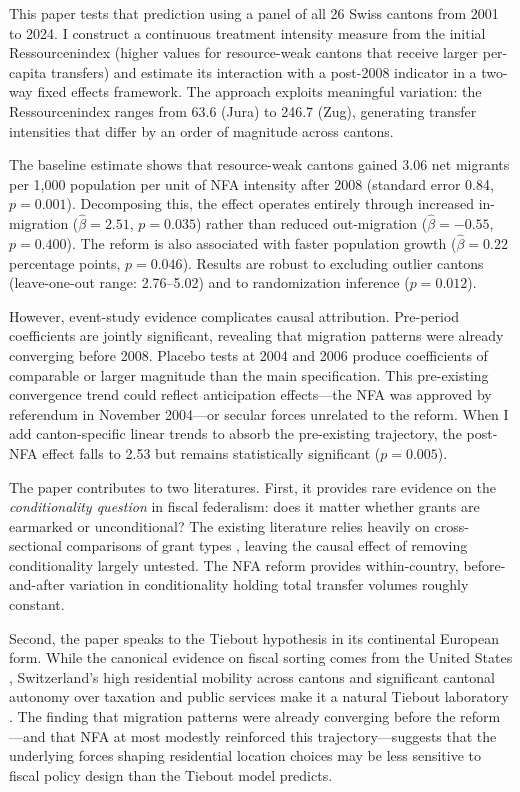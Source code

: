 \documentclass[12pt]{article}
\begin{document}
This paper tests that prediction using a panel of all 26 Swiss cantons from 2001 to 2024. I construct a continuous treatment intensity measure from the initial Ressourcenindex (higher values for resource-weak cantons that receive larger per-capita transfers) and estimate its interaction with a post-2008 indicator in a two-way fixed effects framework. The approach exploits meaningful variation: the Ressourcenindex ranges from 63.6 (Jura) to 246.7 (Zug), generating transfer intensities that differ by an order of magnitude across cantons.

The baseline estimate shows that resource-weak cantons gained 3.06 net migrants per 1,000 population per unit of NFA intensity after 2008 (standard error 0.84, $p = 0.001$). Decomposing this, the effect operates entirely through increased in-migration ($\hat{\beta} = 2.51$, $p = 0.035$) rather than reduced out-migration ($\hat{\beta} = -0.55$, $p = 0.400$). The reform is also associated with faster population growth ($\hat{\beta} = 0.22$ percentage points, $p = 0.046$). Results are robust to excluding outlier cantons (leave-one-out range: 2.76--5.02) and to randomization inference ($p = 0.012$).

However, event-study evidence complicates causal attribution. Pre-period coefficients are jointly significant, revealing that migration patterns were already converging before 2008. Placebo tests at 2004 and 2006 produce coefficients of comparable or larger magnitude than the main specification. This pre-existing convergence trend could reflect anticipation effects---the NFA was approved by referendum in November 2004---or secular forces unrelated to the reform. When I add canton-specific linear trends to absorb the pre-existing trajectory, the post-NFA effect falls to 2.53 but remains statistically significant ($p = 0.005$).

The paper contributes to two literatures. First, it provides rare evidence on the \textit{conditionality question} in fiscal federalism: does it matter whether grants are earmarked or unconditional? The existing literature relies heavily on cross-sectional comparisons of grant types \citep{Knight2002, GordonKnight2009}, leaving the causal effect of removing conditionality largely untested. The NFA reform provides within-country, before-and-after variation in conditionality holding total transfer volumes roughly constant.

Second, the paper speaks to the Tiebout hypothesis in its continental European form. While the canonical evidence on fiscal sorting comes from the United States \citep{Epple2010}, Switzerland's high residential mobility across cantons and significant cantonal autonomy over taxation and public services make it a natural Tiebout laboratory \citep{Schmidheiny2006, BrulhartParchet2014}. The finding that migration patterns were already converging before the reform---and that NFA at most modestly reinforced this trajectory---suggests that the underlying forces shaping residential location choices may be less sensitive to fiscal policy design than the Tiebout model predicts.
\end{document}
